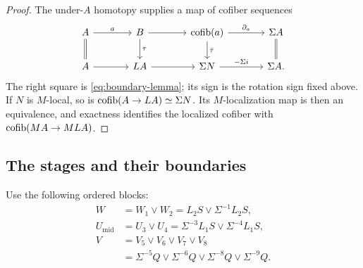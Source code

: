\begin{proof}
The under-\(A\) homotopy supplies a map of cofiber sequences
\[
\begin{tikzcd}[column sep=large]
A \arrow[r,"a"] \arrow[d,equal]
  & B \arrow[r] \arrow[d,"\tau"]
  & \cofib(a) \arrow[r,"\partial_a"] \arrow[d,"\bar\tau"]
  & \Sigma A \arrow[d,equal]\\
A \arrow[r]
  & LA \arrow[r]
  & \Sigma N \arrow[r,"-\Sigma i"]
  & \Sigma A.
\end{tikzcd}
\]
The right square is \eqref{eq:boundary-lemma}; its sign is the
rotation sign fixed above.  If \(N\) is \(M\)-local, so is
\(\operatorname{cofib}(A\to LA)\simeq\Sigma N\).  Its \(M\)-localization
map is then an equivalence, and exactness identifies the localized
cofiber with \(\operatorname{cofib}(MA\to MLA)\).
\end{proof}

\subsection{The stages and their boundaries}

Use the following ordered blocks:
\[
\begin{aligned}
 W&=W_1\vee W_2=L_2S\vee\Sigma^{-1}L_2S,\\
 U_{\mathrm{mid}}&=U_3\vee U_4=\Sigma^{-3}L_1S\vee\Sigma^{-4}L_1S,\\
 V&=V_5\vee V_6\vee V_7\vee V_8\\
  &=\Sigma^{-5}Q\vee\Sigma^{-6}Q
       \vee\Sigma^{-8}Q\vee\Sigma^{-9}Q.
\end{aligned}
\]

